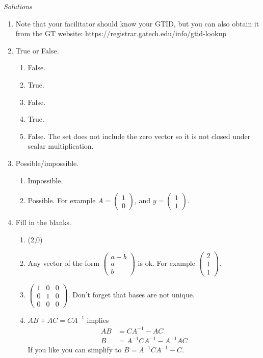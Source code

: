 \documentclass[12pt]{exam}
\begin{document}
\newpage
{\color{DarkBlue} \textit{Solutions} 
\begin{enumerate}
    \item Note that your facilitator should know your GTID, but you can also obtain it from the GT website: https://registrar.gatech.edu/info/gtid-lookup
    \item True or False. 
    \begin{enumerate}
        \item False. 
        \item True.
        \item False. 
        \item True.
        \item False. The set does not include the zero vector so it is not closed under scalar multiplication. 
    \end{enumerate}
    \item Possible/impossible. 
    \begin{enumerate}
        \item Impossible. 
        \item Possible. For example $A = \begin{pmatrix} 1\\0\end{pmatrix}$, and $y = \begin{pmatrix}1\\1 \end{pmatrix}$.
    \end{enumerate}
    \item Fill in the blanks. 
    \begin{enumerate}
        \item (2,0)
        \item Any vector of the form $\begin{pmatrix} a+b\\a\\b \end{pmatrix}$ is ok. For example $\begin{pmatrix}2\\1\\1 \end{pmatrix}$.
        \item $\begin{pmatrix} 1&0&0\\0&1&0\\0&0&0 \end{pmatrix}$. Don't forget that bases are not unique. 
        \item $AB+AC=CA^{-1}$ implies
        \begin{align*}
            AB &= CA^{-1} -AC\\
            B & = A^{-1}CA^{-1} -A^{-1}AC
        \end{align*}
        If you like you can simplify to $B = A^{-1}CA^{-1} - C$.
    \end{enumerate}
\end{enumerate}

} 
\end{document}
